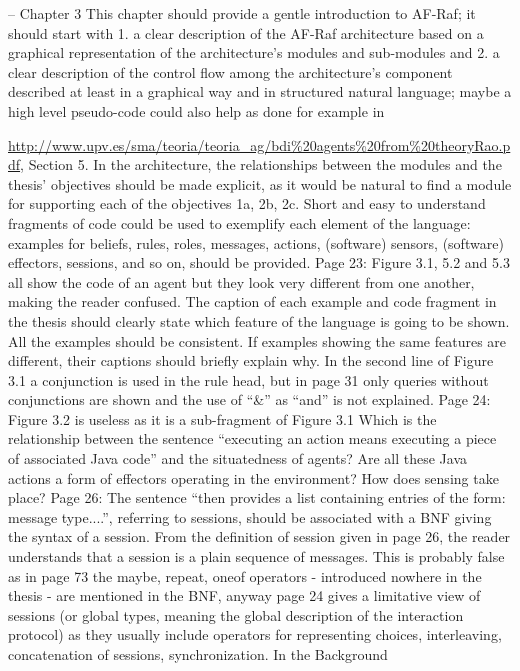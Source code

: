\documentclass{article}
\newenvironment{them}{\noindent\begingroup\color{blue}}{\endgroup\par}
\begin{document}
\begin{them}
-- Chapter 3
This chapter should provide a gentle introduction to AF-Raf; it should start with
1. a clear description of the AF-Raf architecture based on a graphical representation of the
architecture's modules and sub-modules and
2. a clear description of the control flow among the architecture's component described at least in a
graphical way and in structured natural language; maybe a high level pseudo-code could also help as
done for example in

\url{http://www.upv.es/sma/teoria/teoria_ag/bdi\%20agents\%20from\%20theoryRao.pdf},
Section 5.
In the architecture, the relationships between the modules and the thesis' objectives should be made explicit, as it would be natural to find a module for supporting each of the objectives 1a, 2b, 2c.
Short and easy to understand fragments of code could be used to exemplify each element of the language: examples for beliefs, rules, roles, messages, actions, (software) sensors, (software) effectors, sessions, and so on, should be provided.
Page 23:
Figure 3.1, 5.2 and 5.3 all show the code of an agent but they look very different from one another, making the reader confused. The caption of each example and code fragment in the thesis should clearly state which feature of the language is going to be shown. All the examples should be consistent. If examples showing the same features are different, their captions should briefly explain why.
In the second line of Figure 3.1 a conjunction is used in the rule head, but in page 31 only queries without conjunctions are shown and the use of “\&” as “and” is not explained.
Page 24:
Figure 3.2 is useless as it is a sub-fragment of Figure 3.1
Which is the relationship between the sentence “executing an action means executing a piece of
associated Java code” and the situatedness of agents? Are all these Java actions a form of effectors
operating in the environment? How does sensing take place?
Page 26:
The sentence “then provides a list containing entries of the form: message type....”, referring to
sessions, should be associated with a BNF giving the syntax of a session. From the definition of
session given in page 26, the reader understands that a session is a plain sequence of messages. This
is probably false as in page 73 the maybe, repeat, oneof operators - introduced nowhere in the thesis
- are mentioned in the BNF, anyway page 24 gives a limitative view of sessions (or global types,
meaning the global description of the interaction protocol) as they usually include operators for
representing choices, interleaving, concatenation of sessions, synchronization. In the Background

\end{them}
\end{document}
